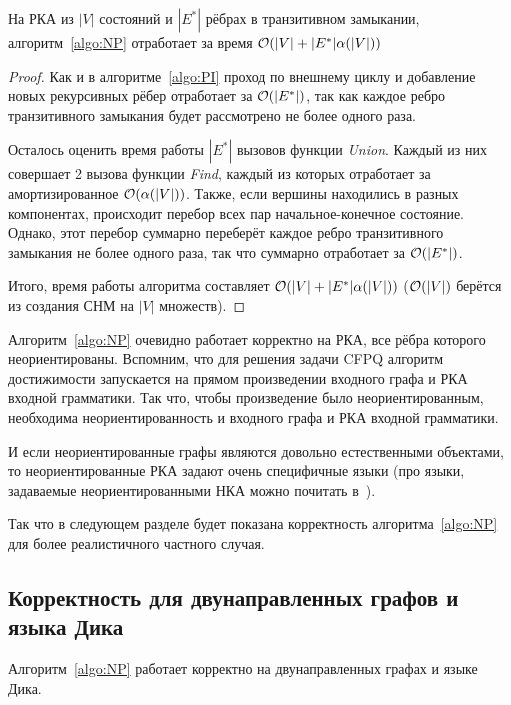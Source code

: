 \begin{theorem}\label{thm:bidirected}
  На РКА из $|V|$ состояний и $|E^{*}|$ рёбрах в транзитивном замыкании, алгоритм~\ref{algo:NP} отработает за время $\mathcal{O}(|V| + |E^{*}| \alpha(|V|))$
\end{theorem}

\begin{proof}
  Как и в алгоритме~\ref{algo:PI} проход по внешнему циклу и добавление новых рекурсивных рёбер отработает за $\mathcal{O}(|E^{*}|)$, так как каждое ребро транзитивного замыкания будет рассмотрено не более одного раза.

  Осталось оценить время работы $|E^{*}|$ вызовов функции \textit{Union}. Каждый из них совершает 2 вызова функции \textit{Find}, каждый из которых отработает за амортизированное $\mathcal{O}(\alpha(|V|))$. Также, если вершины находились в разных компонентах, происходит перебор всех пар начальное-конечное состояние. Однако, этот перебор суммарно переберёт каждое ребро транзитивного замыкания не более одного раза, так что суммарно отработает за $\mathcal{O}(|E^{*}|)$.

  Итого, время работы алгоритма составляет $\mathcal{O}(|V| + |E^{*}| \alpha(|V|))$ ($\mathcal{O}(|V|)$ берётся из создания СНМ на $|V|$ множеств). 
\end{proof}

\begin{note}
  Алгоритм~\ref{algo:NP} очевидно работает корректно на РКА, все рёбра которого неориентированы. Вспомним, что для решения задачи CFPQ алгоритм достижимости запускается на прямом произведении входного графа и РКА входной грамматики. Так что, чтобы произведение было неориентированным, необходима неориентированность и входного графа и РКА входной грамматики. 

  И если неориентированные графы являются довольно естественными объектами, то неориентированные РКА задают очень специфичные языки (про языки, задаваемые неориентированными НКА можно почитать в~\cite{Kutrib18}). 

  Так что в следующем разделе будет показана корректность алгоритма~\ref{algo:NP} для более реалистичного частного случая.
\end{note}

\subsection{Корректность для двунаправленных графов и языка Дика}

\begin{theorem}\label{th:bidir_corr}
  Алгоритм~\ref{algo:NP} работает корректно на двунаправленных графах и языке Дика.
\end{theorem}

